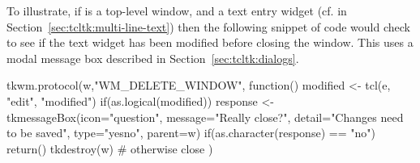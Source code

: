 To illustrate, if  is a top-level window, and  a text
entry widget (cf.  in
Section~\ref{sec:tcltk:multi-line-text}) then the following snippet of
code would check to see if the text widget has been modified before
closing the window. This uses a modal message box described in
Section~\ref{sec:tcltk:dialogs}.



\begin{Schunk}
\begin{Sinput}
 tkwm.protocol(w,"WM_DELETE_WINDOW", function() {
   modified <- tcl(e, "edit", "modified")
   if(as.logical(modified)) {
     response <- 
       tkmessageBox(icon="question",
                    message="Really close?",
                    detail="Changes need to be saved",
                    type="yesno",
                    parent=w)
     if(as.character(response) == "no")
       return()
   }
   tkdestroy(w)                          # otherwise close
 })
\end{Sinput}
\end{Schunk}



